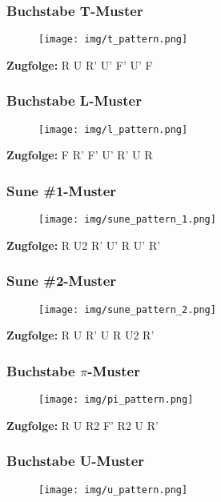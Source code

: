 \documentclass[letterpaper,10pt,twoside,twocolumn,openany]{book}
\begin{document}
\subsubsection{Buchstabe T-Muster}
\begin{figure}[!htb] 
  \centering
     \texttt{[image: img/t\_pattern.png]}
\end{figure}

\centering \textbf{Zugfolge:} R U R' U' F' U' F

\subsubsection{Buchstabe L-Muster}
\begin{figure}[!htb] 
  \centering
     \texttt{[image: img/l\_pattern.png]}
\end{figure}

\centering \textbf{Zugfolge:} F R' F' U' R' U R

\subsubsection{Sune \#1-Muster}
\begin{figure}[!htb] 
  \centering
     \texttt{[image: img/sune\_pattern\_1.png]}
\end{figure}

\centering \textbf{Zugfolge:} R U2 R' U' R U' R'


\subsubsection{Sune \#2-Muster}
\begin{figure}[!htb] 
  \centering
     \texttt{[image: img/sune\_pattern\_2.png]}
\end{figure}
\centering \textbf{Zugfolge:} R U R' U R U2 R'

\subsubsection{Buchstabe $\pi$-Muster}
\begin{figure}[!htb] 
  \centering
     \texttt{[image: img/pi\_pattern.png]}
\end{figure}

\centering \textbf{Zugfolge:} R U R2 F' R2 U R'

\newpage
\subsubsection{Buchstabe U-Muster}
\begin{figure}[!htb] 
  \centering
     \texttt{[image: img/u\_pattern.png]}
\end{figure}
\end{document}
